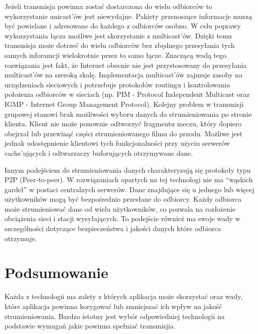 Jeżeli transmisja powinna zostać dostarczona do wielu odbiorców to wykorzystanie unicast'ów jest niewydajne. Pakiety przenoszące informacje muszą być powielane i adresowane do każdego z odbiorców osobno. W celu poprawy wykorzystania łącza możliwe jest skorzystanie z multicast'ów. Dzięki temu transmisja może dotrzeć do wielu odbiorców bez zbędnego przesyłania tych samych inforamcji wielokrotnie przez to samo łącze. Znaczącą wadą tego rozwiązania jest fakt, że Internet obecnie nie jest przystosowany do przesyłania multicast'ów na szeroką skalę. Implementacja multicast'ów zajmuje zasoby na urządzeniach sieciowych i potrzebuje protokołów routingu i kontrolowania położenia odbiorców w sieciach (np. PIM - Protocol Independent Multicast oraz IGMP - Internet Group Management Protocol). Kolejny problem w transmisji grupowej stanowi brak możliwości wyboru danych do strumieniowania po stronie klienta. Klient nie może ponownie odtworzyć fragmentu meczu, który dopiero obejrzał lub przewinąć części strumieniowanego filmu do przodu. Możliwe jest jednak udostępnienie klientowi tych funkcjonalności przy użyciu serwerów cache'ujących i odtwarzaczy buforujących otrzymywane dane.

Innym podejściem do strumieniowania danych charakteryzują się protokoły typu P2P (Peer-to-peer). W rozwiązaniach opartych na tej technologi nie ma ``wąskich gardeł'' w postaci centralnych serwerów. Dane znajdujące się u jednego lub więcej użytkowników mogą być bezpośrednio przesłane do odbiorcy. Każdy odbiorca może strumieniować dane od wielu użytkowników, co pozwala na rozłożenie obciążenia sieci i stacji wysyłających. To podejście również ma swoje wady w szczególności dotyczące bezpieczeństwa i jakości danych które odbiorca otrzymuje. 

\section{Podsumowanie}

Każda z technologii ma zalety z których aplikacja może skorzystać oraz wady, które aplikacja powinna korygować lub zmniejszać ich wpływ na jakość strumieniowania. Bardzo istotny jest wybór odpowiedniej technologii na podstawie wymagań jakie powinna spełniać transmisjia.